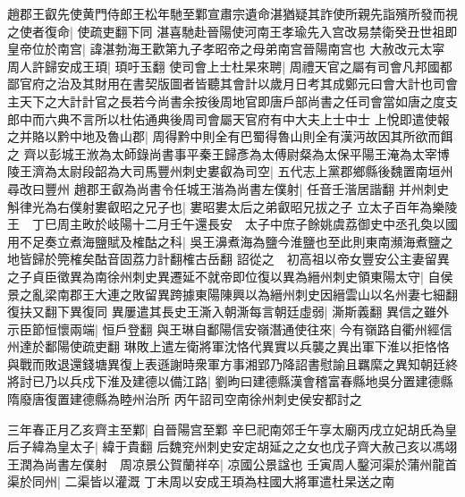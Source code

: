 趙郡王叡先使黄門侍郎王松年馳至鄴宣肅宗遺命湛猶疑其詐使所親先詣殯所發而視之使者復命|{
	使疏吏翻下同}
湛喜馳赴晉陽使河南王孝瑜先入宫改易禁衛癸丑世祖即皇帝位於南宫|{
	諱湛勃海王歡第九子孝昭帝之母弟南宫晉陽南宫也}
大赦改元太寜　周人許歸安成王頊|{
	頊吁玉翻}
使司會上士杜杲來聘|{
	周禮天官之屬有司會凡邦國都鄙官府之治及其財用在書契版圖者皆聽其會計以歲月日考其成鄭元曰會大計也司會主天下之大計計官之長若今尚書余按後周地官即唐戶部尚書之任司會當如唐之度支郎中而六典不言所以杜佑通典後周司會屬天官府有中大夫上士中士}
上悅即遣使報之并賂以黔中地及魯山郡|{
	周得黔中則全有巴蜀得魯山則全有漢沔故因其所欲而餌之}
齊以彭城王浟為太師錄尚書事平秦王歸彥為太傅尉粲為太保平陽王淹為太宰博陵王濟為太尉段韶為大司馬豐州刺史婁叡為司空|{
	五代志上黨郡鄉縣後魏置南垣州尋改曰豐州}
趙郡王叡為尚書令任城王湝為尚書左僕射|{
	任音壬湝居諧翻}
并州刺史斛律光為右僕射婁叡昭之兄子也|{
	婁昭婁太后之弟叡昭兄拔之子}
立太子百年為樂陵王　丁巳周主畋於岐陽十二月壬午還長安　太子中庶子餘姚虞荔御史中丞孔奐以國用不足奏立煮海鹽賦及榷酤之科|{
	吳王濞煮海為鹽今淮鹽也至此則東南瀕海煮鹽之地皆歸於筦榷矣酤音固荔力計翻榷古岳翻}
詔從之　初高祖以帝女豐安公主妻留異之子貞臣徵異為南徐州刺史異遷延不就帝即位復以異為縉州刺史領東陽太守|{
	自侯景之亂梁南郡王大連之敗留異跨據東陽陳興以為縉州刺史因縉雲山以名州妻七細翻復扶又翻下異復同}
異屢遣其長史王澌入朝澌每言朝廷虛弱|{
	澌斯義翻}
異信之雖外示臣節恒懷兩端|{
	恒戶登翻}
與王琳自鄱陽信安嶺潛通使往來|{
	今有嶺路自衢州經信州達於鄱陽使疏吏翻}
琳敗上遣左衛將軍沈恪代異實以兵襲之異出軍下淮以拒恪恪與戰而敗退還錢塘異復上表遜謝時衆軍方事湘郢乃降詔書慰諭且羈縻之異知朝廷終將討已乃以兵戍下淮及建德以備江路|{
	劉昫曰建德縣漢會稽富春縣地吳分置建德縣隋廢唐復置建德縣為睦州治所}
丙午詔司空南徐州刺史侯安都討之

三年春正月乙亥齊主至鄴|{
	自晉陽宫至鄴}
辛巳祀南郊壬午享太廟丙戌立妃胡氏為皇后子緯為皇太子|{
	緯于貴翻}
后魏兖州刺史安定胡延之之女也戊子齊大赦己亥以馮翊王潤為尚書左僕射　周凉景公賀蘭祥卒|{
	凉國公景諡也}
壬寅周人鑿河渠於蒲州龍首渠於同州|{
	二渠皆以灌溉}
丁未周以安成王頊為柱國大將軍遣杜杲送之南

